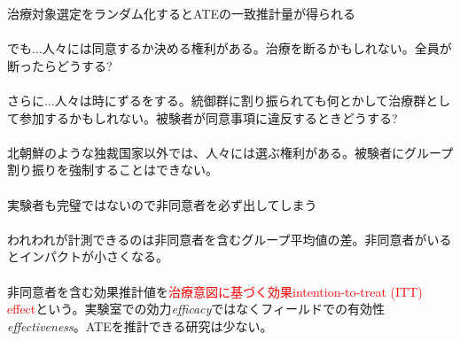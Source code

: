 \begin{frame}{}
治療対象選定をランダム化するとATEの一致推計量が得られる\\~\\

\pause
でも...\pause 人々には同意するか決める権利がある。治療を断るかもしれない。全員が断ったらどうする?\\~\\
\pause
さらに...\pause 人々は時にずるをする。統御群に割り振られても何とかして治療群として参加するかもしれない。被験者が同意事項に違反するときどうする?\\~\\

\pause
北朝鮮のような独裁国家以外では、人々には選ぶ権利がある。被験者にグループ割り振りを強制することはできない。\\~\\
\pause
実験者も完璧ではないので非同意者を必ず出してしまう\\~\\

\pause
われわれが計測できるのは非同意者を含むグループ平均値の差。非同意者がいるとインパクトが小さくなる。\\~\\
\pause
非同意者を含む効果推計値を\textcolor{red}{治療意図に基づく効果intention-to-treat (ITT) effect}という。実験室での効力\textit{efficacy}ではなくフィールドでの有効性\textit{effectiveness}。ATEを推計できる研究は少ない。

\end{frame}


